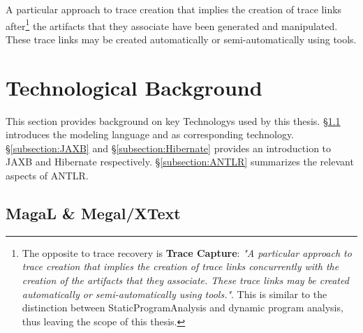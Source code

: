 \begin{definition}
A particular approach to trace creation that implies the creation of trace links after\footnote{The opposite to trace recovery is \textbf{Trace Capture}: \textit{"A particular approach to trace creation that implies the creation of trace links concurrently with the creation of the artifacts that they associate. These trace links may be created automatically or semi-automatically using tools."}\cite{DBLP:books/daglib/p/GotelCHZEGDAMM12}. This is similar to the distinction between \gls{StaticProgramAnalysis} and dynamic program analysis, thus leaving the scope of this thesis.} the artifacts that they associate have been generated and manipulated.
These trace links may be created automatically or semi-automatically using tools. 
\cite{DBLP:books/daglib/p/GotelCHZEGDAMM12}
\end{definition}


\section{Technological Background}
This section provides background on key \glspl{Technology} used by this thesis.
§\ref{subsection:MegaLXText} introduces the \megal modeling language and \megalxtext as corresponding technology.
§\ref{subsection:JAXB} and §\ref{subsection:Hibernate} provides an introduction to \gls{JAXB} and \gls{Hibernate} respectively.
§\ref{subsection:ANTLR} summarizes the relevant aspects of \gls{ANTLR}.

\subsection{MagaL \& Megal/XText}
\label{subsection:MegaLXText}
\cite{DBLP:conf/sattose/BaggeZ14}
\cite{DBLP:journals/entcs/FavreN05}
\cite{DBLP:conf/ecmdafa/LammelV14}
\cite{DBLP:conf/models/FavreLV12}
\cite{DBLP:conf/sle/Lammel16}
\cite{LukasHaertelBScThesis}

